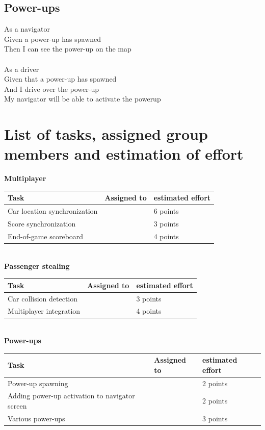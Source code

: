 \documentclass{article}
\begin{document}
\subsection*{Power-ups}
As a navigator\\
Given a power-up has spawned\\
Then I can see the power-up on the map\\\\
As a driver\\
Given that a power-up has spawned\\
And I drive over the power-up\\
My navigator will be able to activate the powerup
\section*{List of tasks, assigned group members and estimation of effort}
\textbf{Multiplayer} \\
\begin{tabular}{ | l | l | l | }
\hline
\textbf{Task} & \textbf{Assigned to} & \textbf{estimated effort} \\ \hline
Car location synchronization &  & 6 points\\ \hline
Score synchronization & & 3 points\\ \hline
End-of-game scoreboard & & 4 points\\ 
 \hline
\end{tabular} \newline
\newline \\
\textbf{Passenger stealing} \\
\begin{tabular}{ | l | l | l | }
\hline
\textbf{Task} & \textbf{Assigned to} & \textbf{estimated effort} \\ \hline
Car collision detection & & 3 points\\ \hline
Multiplayer integration & & 4 points\\ \hline
\end{tabular}
\newline \\
\textbf{Power-ups} \\
\begin{tabular}{ | l | l | l | }
\hline
\textbf{Task} & \textbf{Assigned to} & \textbf{estimated effort} \\ \hline
Power-up spawning & & 2 points\\ \hline
Adding power-up activation to navigator screen& & 2 points \\ \hline
Various power-ups & & 3 points\\ \hline
\end{tabular}
\end{document}
